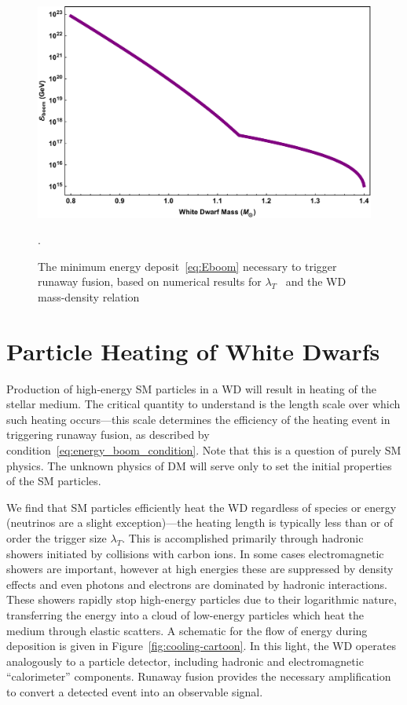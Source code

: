 \documentclass[preprintnumbers,amsmath,amssymb,prd,superscriptaddress]{revtex4}
\begin{document}
\begin{figure}
\includegraphics[scale=.35]{Eboom.pdf}
\caption{The minimum energy deposit~\eqref{eq:Eboom} necessary to trigger runaway fusion, based on numerical results for $\lambda_T$~\cite{Woosley} and the WD mass-density relation~\cite{cococubed}}.
\label{fig:Eboom}
\end{figure}

\section{Particle Heating of White Dwarfs}
\label{sec:smheating}
Production of high-energy SM particles in a WD will result in heating of the stellar medium.
The critical quantity to understand is the length scale over which such heating occurs---this scale determines the efficiency of the heating event in triggering runaway fusion, as described by condition~\eqref{eq:energy_boom_condition}.
Note that this is a question of purely SM physics.
The unknown physics of DM will serve only to set the initial properties of the SM particles.

We find that SM particles efficiently heat the WD regardless of species or energy (neutrinos are a slight exception)---the heating length is typically less than or of order the trigger size $\lambda_T$.
This is accomplished primarily through hadronic showers initiated by collisions with carbon ions.
In some cases electromagnetic showers are important, however at high energies these are suppressed by density effects and even photons and electrons are dominated by hadronic interactions.
These showers rapidly stop high-energy particles due to their logarithmic nature, transferring the energy into a cloud of low-energy particles which heat the medium through elastic scatters.
A schematic for the flow of energy during deposition is given in Figure~\ref{fig:cooling-cartoon}.
In this light, the WD operates analogously to a particle detector, including hadronic and electromagnetic ``calorimeter'' components.
Runaway fusion provides the necessary amplification to convert a detected event into an observable signal.
\end{document}
